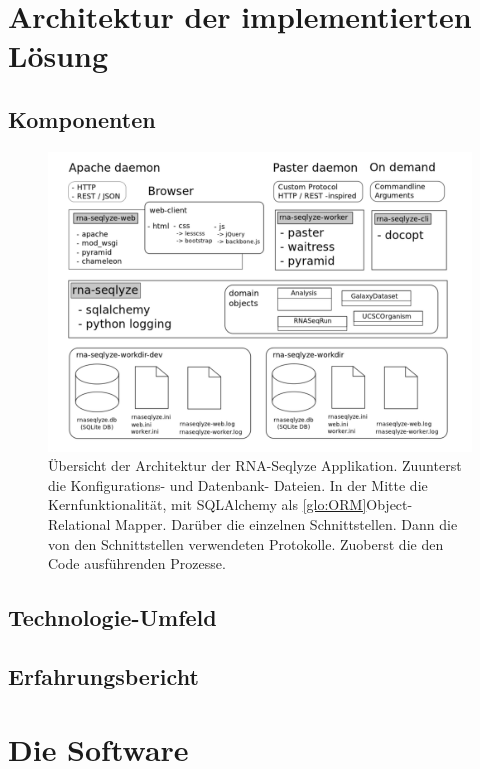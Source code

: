 \documentclass[a4paper]{thesis}
\begin{document}
\section{Architektur der implementierten Lösung}

\subsection{Komponenten}

\begin{figure}[h]
\includegraphics{img/overview_architektur}
\caption[Applikationsarchitektur]{
	Übersicht der Architektur der RNA-Seqlyze Applikation.
	Zuunterst die Konfigurations- und Datenbank- Dateien.
	In der Mitte die Kernfunktionalität, mit SQLAlchemy
	als \ref{glo:ORM}{Object-Relational Mapper}.
        Darüber die einzelnen Schnittstellen.
	Dann die von den Schnittstellen verwendeten Protokolle.
	Zuoberst die den Code ausführenden Prozesse.
}
\label{fig:arch}
\end{figure}

\subsection{Technologie-Umfeld}

\subsection{Erfahrungsbericht}

\section{Die Software}
\end{document}
